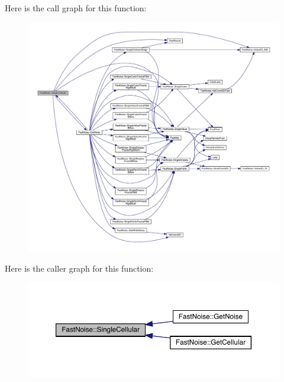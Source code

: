 Here is the call graph for this function\+:
\nopagebreak
\begin{figure}[H]
\begin{center}
\leavevmode
\includegraphics[width=350pt]{class_fast_noise_a9729b73152368fb1c494bf4ab7cbe19e_cgraph}
\end{center}
\end{figure}
Here is the caller graph for this function\+:
\nopagebreak
\begin{figure}[H]
\begin{center}
\leavevmode
\includegraphics[width=350pt]{class_fast_noise_a9729b73152368fb1c494bf4ab7cbe19e_icgraph}
\end{center}
\end{figure}
\mbox{\label{class_fast_noise_a0d55ad41a81a37df679a5ed92cef2d36}} 
